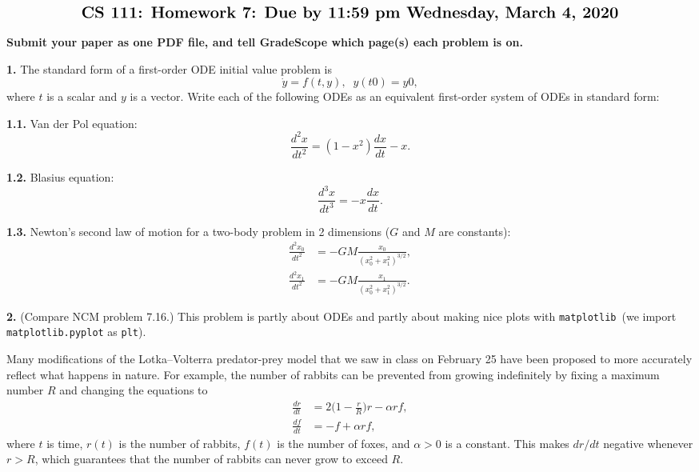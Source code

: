 \documentclass[11pt]{article}
\newcommand{\matplotlib}{{\tt matplotlib}}  %
\begin{document}
$$\mbox{\Large \bf CS 111: Homework 7: Due by 11:59 pm Wednesday, March 4, 2020}$$
\par\smallskip\noindent
{\bf Submit your paper as one PDF file,
and tell GradeScope which page(s) each problem is on.}

\par\bigskip
{\bf 1.}
The standard form of a first-order ODE initial value problem is
$$ \dot y = f(t, y), \;\; y(t0) = y0, $$
where $t$ is a scalar and $y$ is a vector.
Write each of the following ODEs as an equivalent first-order system
of ODEs in standard form:

\par\bigskip
{\bf 1.1.} Van der Pol equation:
$$ \frac{d^2 x}{dt^2} = (1-x^2)\frac{dx}{dt} - x . $$

\par\bigskip
{\bf 1.2.} Blasius equation:
$$ \frac{d^3 x}{dt^3} = -x\frac{dx}{dt}. $$

\par\bigskip
{\bf 1.3.} Newton's second law of motion for a two-body problem in 2 dimensions 
($G$ and $M$ are constants):
\begin{align}
\frac{d^2 x_0}{dt^2} &= -GM\frac{x_0}{(x_0^2 + x_1^2)^{3/2}}, \\
\frac{d^2 x_1}{dt^2} &= -GM\frac{x_1}{(x_0^2 + x_1^2)^{3/2}}.
\end{align}

\par\bigskip
{\bf 2.} (Compare NCM problem 7.16.)
This problem is partly about ODEs and partly about making nice plots with
\matplotlib\ (we import {\tt matplotlib.pyplot} as {\tt plt}).

Many modifications of the Lotka--Volterra predator-prey model
that we saw in class on February 25 have been proposed to
more accurately reflect what happens in nature.
For example, the number of rabbits can be prevented from growing
indefinitely by fixing a maximum number $R$ and changing the equations to
\begin{align}
\frac{dr}{dt} &= 2\Big(1-\frac{r}{R}\Big)r - \alpha rf, \\
\frac{df}{dt} &= -f + \alpha rf,
\end{align}
where $t$ is time, $r(t)$ is the number of rabbits, 
$f(t)$ is the number of foxes, and $\alpha>0$ is a constant.
This makes $dr/dt$ negative whenever $r > R$, 
which guarantees that the number of rabbits can never grow to exceed $R$.
\end{document}
